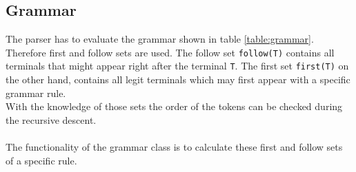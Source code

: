 \subsection{Grammar}
The parser has to evaluate the grammar shown in table \ref{table:grammar}. Therefore first and follow sets are used. The follow set \texttt{follow(T)} contains all terminals that might appear right after the terminal \texttt{T}. The first set \texttt{first(T)} on the other hand, contains all legit terminals which may first appear with a specific grammar rule.\\
With the knowledge of those sets the order of the tokens can be checked during the recursive descent.
\\\\
The functionality of the grammar class is to calculate these first and follow sets of a specific rule.